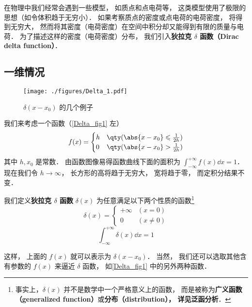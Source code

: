 
\begin{issues}
\issueTODO
\end{issues}

在物理中我们经常会遇到一些模型， 如质点和点电荷等， 这类模型使用了极限的思想（如令体积趋于无穷小）． 如果考察质点的密度或点电荷的电荷密度， 将得到无穷大， 然而将其密度（电荷密度）在空间中积分却又能得到有限的质量与电荷． 为了描述这样的密度（电荷密度）分布， 我们引入\textbf{狄拉克 $\delta$ 函数（Dirac delta function）}．

\subsection{一维情况}

\begin{figure}[ht]
\centering
\texttt{[image: ./figures/Delta\_1.pdf]}
\caption{$\delta(x - x_0)$ 的几个例子} \label{Delta_fig1}
\end{figure}

我们来考虑一个函数（\autoref{Delta_fig1} 左）
\begin{equation}
f(x) =
\begin{cases}
h & \qty( \abs{x - x_0} \leqslant \frac{1}{2h} )\\
0 & \qty( \abs{x - x_0} > \frac{1}{2h} )
\end{cases}
\end{equation}
其中 $h, x_0$ 是常数． 由函数图像易得函数曲线下面的面积为 $\int_{-\infty}^{+\infty} f(x) \dd{x} = 1$． 现在我们令 $h \to \infty$， 长方形的高将趋于无穷大， 宽将趋于零， 而定积分结果不变．

我们定义\textbf{狄拉克 $\delta$ 函数} $\delta(x)$ 为任意满足以下两个性质的函数\footnote{事实上，$\delta(x)$ 并不是数学中一个严格意义上的函数， 而是被称为\textbf{广义函数（generalized function）}或\textbf{分布（distribution）， 详见泛函分析}．} %
\begin{equation}\label{Delta_eq2}
\delta(x) =
\begin{cases}
+\infty & (x = 0)\\
0 & (x \ne 0)
\end{cases}
\end{equation}
\begin{equation}\label{Delta_eq3}
\int_{-\infty}^{+\infty} \delta(x) \dd{x} = 1
\end{equation}

这样， 上面的 $f(x)$ 就可以表示为 $\delta(x - x_0)$． 当然， 我们还可以选取其他含有参数的 $f(x)$ 来逼近 $\delta$ 函数， 如\autoref{Delta_fig1} 中的另外两种函数．

